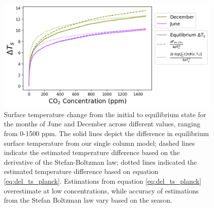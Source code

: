 \documentclass[draft]{agujournal2019}
\begin{document}
\begin{figure}[htb!]
\noindent\includegraphics[width=1\textwidth]{figures/delta_Ts.png}
\centering
\caption{Surface temperature change from the initial to equilibrium state for the months of June and December across different  values, ranging from 0-1500 ppm. The solid lines depict the difference in equilibrium surface temperature from our single column model; dashed lines indicate the estimated temperature difference based on the derivative of the Stefan-Boltzman law; dotted lines indicated the estimated temperature difference based on equation \ref{eq:del_ts_planck}. Estimations from equation \ref{eq:del_ts_planck} overestimate at low  concentrations, while accuracy of estimations from the Stefan Boltzman law vary based on the season.}
\label{fig:delta_ts}
\end{figure}


\end{document}
